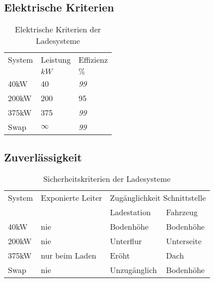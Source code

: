 \subsection{Elektrische Kriterien}
\begin{table}[h!]\centering
	\begin{tabularx}{\linewidth}{XXX}
		\toprule
		System & Leistung & Effizienz \\
		       & $kW$     & $\%$      \\ \midrule
		40kW   & 40       & \emph{99} \\
		200kW  & 200      & 95 \\
		375kW  & 375      & \emph{99} \\
		Swap   & $\infty$ & \emph{99} \\ \bottomrule
	\end{tabularx}
	\caption{Elektrische Kriterien der Ladesysteme}
	\label{tab_el_Ladesys}
\end{table}
\FloatBarrier

\subsection{Zuverlässigkeit}

\begin{table}[h!]\centering
	\begin{tabularx}{\linewidth}{XXXX}
		\toprule
		System         & Exponierte Leiter & \multicolumn{2}{c}{Zugänglichkeit Schnittstelle} \\
		\cmidrule{3-4} &                   & Ladestation  & Fahrzeug                          \\ \midrule
		40kW           & nie               & Bodenhöhe    & Bodenhöhe                         \\
		200kW          & nie               & Unterflur    & Unterseite                        \\
		375kW          & nur beim Laden    & Eröht        & Dach                              \\
		Swap           & nie               & Unzugänglich & Bodenhöhe                         \\ \bottomrule
	\end{tabularx}
	\caption{Sicherheitskriterien der Ladesysteme}
	\label{tab_sich_Ladesys}
\end{table}
\FloatBarrier




